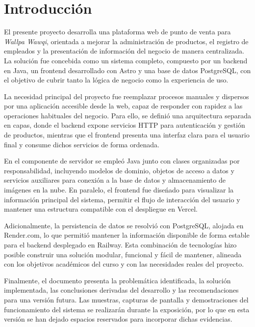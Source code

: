 \vspace*{\fill}

\section{Introducción}

El presente proyecto desarrolla una plataforma web de punto de venta para \textit{Wallpa Wawqi}, orientada a mejorar la administraci\'on de productos, el registro de empleados y la presentaci\'on de informaci\'on del negocio de manera centralizada. La soluci\'on fue concebida como un sistema completo, compuesto por un backend en Java, un frontend desarrollado con Astro y una base de datos PostgreSQL, con el objetivo de cubrir tanto la l\'ogica de negocio como la experiencia de uso.

La necesidad principal del proyecto fue reemplazar procesos manuales y dispersos por una aplicaci\'on accesible desde la web, capaz de responder con rapidez a las operaciones habituales del negocio. Para ello, se defini\'o una arquitectura separada en capas, donde el backend expone servicios HTTP para autenticaci\'on y gesti\'on de productos, mientras que el frontend presenta una interfaz clara para el usuario final y consume dichos servicios de forma ordenada.

En el componente de servidor se emple\'o Java junto con clases organizadas por responsabilidad, incluyendo modelos de dominio, objetos de acceso a datos y servicios auxiliares para conexi\'on a la base de datos y almacenamiento de im\'agenes en la nube. En paralelo, el frontend fue dise\'nado para visualizar la informaci\'on principal del sistema, permitir el flujo de interacci\'on del usuario y mantener una estructura compatible con el despliegue en Vercel.

Adicionalmente, la persistencia de datos se resolvi\'o con PostgreSQL, alojada en Render.com, lo que permiti\'o mantener la informaci\'on disponible de forma estable para el backend desplegado en Railway. Esta combinaci\'on de tecnolog\'ias hizo posible construir una soluci\'on modular, funcional y f\'acil de mantener, alineada con los objetivos acad\'emicos del curso y con las necesidades reales del proyecto.

Finalmente, el documento presenta la problem\'atica identificada, la soluci\'on implementada, las conclusiones derivadas del desarrollo y las recomendaciones para una versi\'on futura. Las muestras, capturas de pantalla y demostraciones del funcionamiento del sistema se realizar\'an durante la exposici\'on, por lo que en esta versi\'on se han dejado espacios reservados para incorporar dichas evidencias.

\vspace*{\fill}
